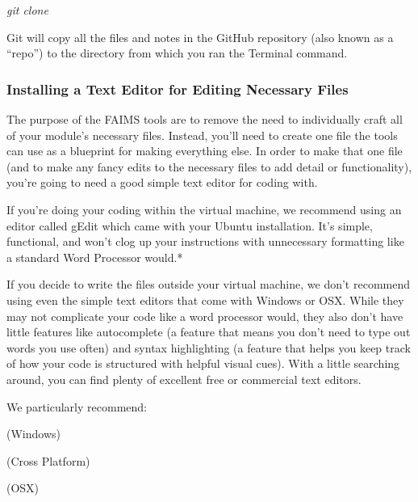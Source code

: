 {\em git clone \from[url10]}

Git will copy all the files and notes in the GitHub repository (also known as a “repo”) to the directory from which you ran the Terminal command.

\subsubsection[section-3]{\crlf
}

\subsubsection[installing-a-text-editor-for-editing-necessary-files]{Installing a Text Editor for Editing Necessary Files}

The purpose of the FAIMS tools are to remove the need to individually craft all of your module's necessary files. Instead, you'll need to create one file the tools can use as a blueprint for making everything else. In order to make that one file (and to make any fancy edits to the necessary files to add detail or functionality), you're going to need a good simple text editor for coding with.

If you're doing your coding within the virtual machine, we recommend using an editor called gEdit which came with your Ubuntu installation. It's simple, functional, and won't clog up your instructions with unnecessary formatting like a standard Word Processor would.*

If you decide to write the files outside your virtual machine, we don't recommend using even the simple text editors that come with Windows or OSX. While they may not complicate your code like a word processor would, they also don't have little features like autocomplete (a feature that means you don't need to type out words you use often) and syntax highlighting (a feature that helps you keep track of how your code is structured with helpful visual cues). With a little searching around, you can find plenty of excellent free or commercial text editors.

We particularly recommend:

\startitemize
\item
  \startblockquote
  \from[url11] (Windows)
  \stopblockquote
\item
  \startblockquote
  \from[url12] (Cross Platform)
  \stopblockquote
\item
  \startblockquote
  \from[url13] (OSX)
  \stopblockquote
\stopitemize


